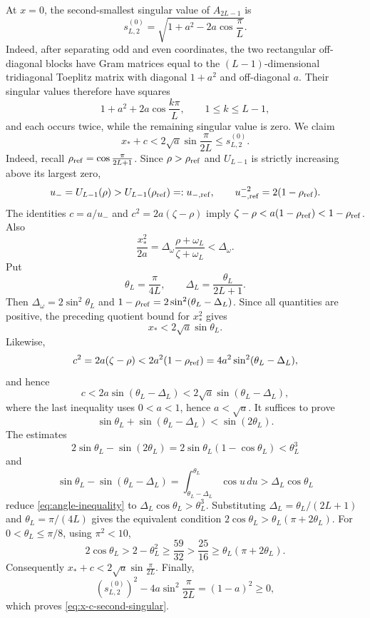\documentclass[12pt,anonymous]{iopjournal}
\numberwithin{equation}{section}
\theoremstyle{remark}
\begin{document}
At \(x=0\), the second-smallest singular value of \(A_{2L-1}\) is
\[
 s_{L,2}^{(0)}=\sqrt{1+a^2-2a\cos\frac{\pi}{L}}.
\]
Indeed, after separating odd and even coordinates, the two rectangular
off-diagonal blocks have Gram matrices equal to the
\((L-1)\)-dimensional tridiagonal Toeplitz matrix with diagonal
\(1+a^2\) and off-diagonal \(a\).  Their singular values therefore have
squares
\[
 1+a^2+2a\cos\frac{k\pi}{L},\qquad 1\leq k\leq L-1,
\]
and each occurs twice, while the remaining singular value is zero.
We claim
\begin{equation}
 x_*+c<2\sqrt a\sin\frac{\pi}{2L}\leq s_{L,2}^{(0)}.
\end{equation}
Indeed, recall \(\rho_{\rm ref}=\cos\frac{\pi}{2L+1}\).  Since
\(\rho>\rho_{\rm ref}\) and \(U_{L-1}\) is strictly increasing above its
largest zero,
\[
 u_-=U_{L-1}(\rho)>U_{L-1}(\rho_{\rm ref})=:u_{-,\rm ref},
 \qquad u_{-,\rm ref}^{-2}=2(1-\rho_{\rm ref}).
\]
The identities \(c=a/u_-\) and \(c^2=2a(\zeta-\rho)\) imply
\(\zeta-\rho<a(1-\rho_{\rm ref})<1-\rho_{\rm ref}\).  Also
\[
 \frac{x_*^2}{2a}
 =\Delta_\omega\frac{\rho+\omega_L}{\zeta+\omega_L}
 <\Delta_\omega.
\]
Put
\[
 \theta_L=\frac{\pi}{4L},\qquad
 \Delta_L=\frac{\theta_L}{2L+1}.
\]
Then \(\Delta_\omega=2\sin^2\theta_L\) and
\(1-\rho_{\rm ref}=2\sin^2(\theta_L-\Delta_L)\).  Since all quantities are
positive, the preceding quotient bound for \(x_*^2\) gives
\[
 x_*<2\sqrt a\sin\theta_L.
\]
Likewise,
\[
 c^2=2a(\zeta-\rho)
 <2a^2(1-\rho_{\rm ref})
 =4a^2\sin^2(\theta_L-\Delta_L),
\]
and hence
\[
 c<2a\sin(\theta_L-\Delta_L)
 <2\sqrt a\sin(\theta_L-\Delta_L),
\]
where the last inequality uses \(0<a<1\), hence \(a<\sqrt a\).
It suffices to prove
\begin{equation}\label{eq:angle-inequality}
 \sin\theta_L+\sin(\theta_L-\Delta_L)<\sin(2\theta_L).
\end{equation}
The estimates
\[
 2\sin\theta_L-\sin(2\theta_L)
 =2\sin\theta_L(1-\cos\theta_L)<\theta_L^3
\]
and
\[
 \sin\theta_L-\sin(\theta_L-\Delta_L)
 =\int_{\theta_L-\Delta_L}^{\theta_L}\cos u\,du
 >\Delta_L\cos\theta_L
\]
reduce \eqref{eq:angle-inequality} to
\(\Delta_L\cos\theta_L>\theta_L^3\).  Substituting
\(\Delta_L=\theta_L/(2L+1)\) and \(\theta_L=\pi/(4L)\) gives the equivalent
condition \(2\cos\theta_L>\theta_L(\pi+2\theta_L)\).  For
\(0<\theta_L\leq\pi/8\), using \(\pi^2<10\),
\[
 2\cos\theta_L>2-\theta_L^2\geq\frac{59}{32}
 >\frac{25}{16}\geq\theta_L(\pi+2\theta_L).
\]
Consequently \(x_*+c<2\sqrt a\sin\frac{\pi}{2L}\).  Finally,
\[
 (s_{L,2}^{(0)})^2-4a\sin^2\frac{\pi}{2L}
 =(1-a)^2\geq0,
\]
which proves \eqref{eq:x-c-second-singular}.
\end{document}
